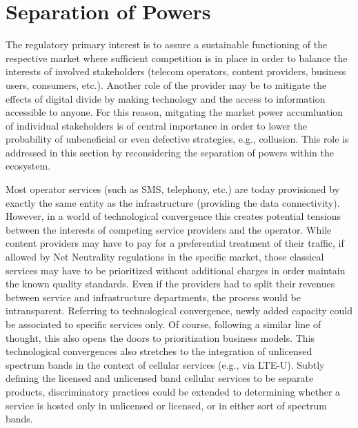 \documentclass[conference]{IEEEtran}
\begin{document}
\section{Separation of Powers} \label{sec:fundamentals}

The regulatory primary interest is to assure a sustainable functioning of the respective market where sufficient competition is in place in order to balance the interests of involved stakeholders (telecom operators, content providers, business users, consumers, etc.). Another role of the provider may be to mitigate the effects of digital divide by making technology and the access to information accessible to anyone. For this reason, mitgating the market power accumluation of individual stakeholders is of central importance in order to lower the probability of unbeneficial or even defective strategies, e.g., collusion. This role is addressed in this section by reconsidering the separation of powers within the ecosystem.



Most operator services (such as SMS, telephony, etc.) are today provisioned by exactly the same entity as the infrastructure (providing the data connectivity). However, in a world of technological convergence this creates potential tensions between the interests of competing service providers and the operator. While content providers may have to pay for a preferential treatment of their traffic, if allowed by Net Neutrality regulations in the specific market, those classical services may have to be prioritized without additional charges in order maintain the known quality standards. Even if the providers had to split their revenues between service and infrastructure departments, the process would be intransparent. Referring to technological convergence, newly added capacity could be associated to specific services only. Of course, following a similar line of thought, this also opens the doors to prioritization business models. This technological convergences also stretches to the integration of unlicensed spectrum bands in the context of cellular services (e.g., via LTE-U). Subtly defining the licensed and unlicensed band cellular services to be separate products, discriminatory practices could be extended to determining whether a service is hosted only in unlicensed or licensed, or in either sort of spectrum bands.
\end{document}
